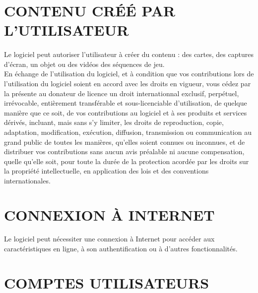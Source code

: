 \documentclass[titlepage, 13px, a4paper]{report}
\begin{document}
\section*{CONTENU CRÉÉ PAR L'UTILISATEUR}
\paragraph*{} \hspace{0pt}
Le logiciel peut autoriser l'utilisateur à créer du contenu : 
des cartes, des captures d'écran, un objet ou des vidéos des séquences de jeu. \\
En échange de l'utilisation du logiciel, et à condition que vos contributions
lors de l'utilisation du logiciel soient en accord avec les droits en vigueur, 
vous cédez par la présente au donateur de licence un droit internationnal
exclusif, perpétuel, irrévocable, entièrement transférable et sous-licenciable
d'utilisation, de quelque manière que ce soit, de vos contributions au logiciel
et à ses produits et services dérivés, incluant, mais sans s'y limiter, les
droits de reproduction, copie, adaptation, modification, exécution, diffusion,
transmission ou communication au grand public de toutes les manières, qu'elles
soient connues ou inconnues, et de distribuer vos contributions sans aucun avis
préalable ni aucune compensation, quelle qu'elle soit, pour toute la durée de la protection acordée
par les droits sur la propriété intellectuelle, en application des lois et des
conventions internationales. \\


\section*{CONNEXION À INTERNET}
\paragraph*{} \hspace{0pt}
Le logiciel peut nécessiter une connexion à Internet pour accéder aux
caractéristiques en ligne, à son authentification ou à d'autres fonctionnalités. \\
 

\section*{COMPTES UTILISATEURS}
\paragraph*{} \hspace{0pt}
\end{document}
